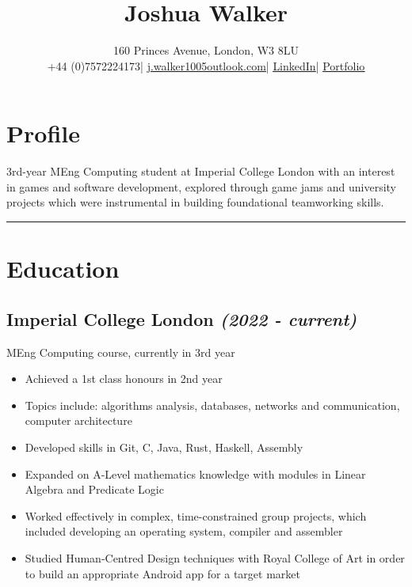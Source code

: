 \documentclass{article}
\newcommand{\mrule} {\null\noindent\rule{\textwidth}{0.4pt}}
\newcommand{\mdiv} {\hspace*{0.8em}|\hspace*{0.8em}}
\newcommand{\mdates} {\hspace*{\fill}\textit}
\begin{document}
\title{\textbf{Joshua Walker}}
\date{}
\author{
    160 Princes Avenue, London, W3 8LU\\
    +44 (0)7572224173\mdiv
        \href{mailto:j.walker1005@outlook.com}{\underline{j.walker1005{\small{}}outlook.com}}\mdiv
        \href{https://www.linkedin.com/in/joshua-walker-080714238/}{\underline{LinkedIn}}\mdiv
        \href{https://josh-ja-walker.github.io/portfolio/}{\underline{Portfolio}}
}

\maketitle


\section*{Profile}

3rd-year MEng Computing student at Imperial College London with an interest in games and software development, 
    explored through game jams and university projects which were instrumental in building foundational teamworking skills.

\mrule


\section*{Education}

\subsection*{\textbf{Imperial College London} \mdates{(2022 - current)}}

MEng Computing course, currently in 3rd year

\begin{itemize}[noitemsep]
    \item Achieved a 1st class honours in 2nd year
    \item Topics include: algorithms analysis, databases, networks and communication, computer architecture
    \item Developed skills in Git, C, Java, Rust, Haskell, Assembly
    \item Expanded on A-Level mathematics knowledge with modules in Linear Algebra and Predicate Logic
    \item Worked effectively in complex, time-constrained group projects, which included developing an operating system, compiler and assembler
    \item Studied Human-Centred Design techniques with Royal College of Art in order to build an appropriate Android app for a target market
\end{itemize}
\end{document}
